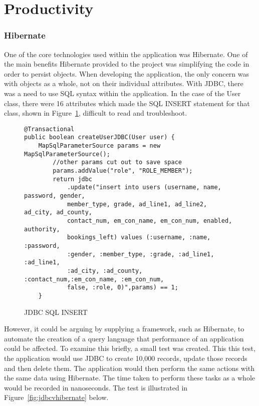 \section{Productivity}

\subsubsection{Hibernate}

One of the core technologies used within the application was Hibernate. One of the main benefits Hibernate provided to the project was simplifying the code in order to persist objects. When developing the application, the only concern was with objects as a whole, not on their individual attributes. With JDBC, there was a need to use SQL syntax within the application. In the case of the User class, there were 16 attributes which made the SQL INSERT statement for that class, shown in Figure~\ref{fig:jdbcsql}, difficult to read and troubleshoot.

\begin{figure}[H]
\begin{lstlisting}
@Transactional
public boolean createUserJDBC(User user) {
	MapSqlParameterSource params = new MapSqlParameterSource();
		//other params cut out to save space
		params.addValue("role", "ROLE_MEMBER");
		return jdbc
			.update("insert into users (username, name, password, gender, 
			member_type, grade, ad_line1, ad_line2, ad_city, ad_county,
			contact_num, em_con_name, em_con_num, enabled, authority,
			bookings_left) values (:username, :name, :password, 
			:gender, :member_type, :grade, :ad_line1, :ad_line1, 
			:ad_city, :ad_county, :contact_num,:em_con_name, :em_con_num,
			false, :role, 0)",params) == 1;
	}
\end{lstlisting}
\caption{JDBC SQL INSERT}
\label{fig:jdbcsql}
\end{figure}

However, it could be arguing by supplying a framework, such as Hibernate, to automate the creation of a query language that performance of an application could be affected. To examine this briefly, a small test was created. This this test, the application would use JDBC to create 10,000 records, update those records and then delete them. The application would then perform the same actions with the same data using Hibernate. The time taken to perform these tasks as a whole would be recorded in nanoseconds. The test is illustrated in Figure~\ref{fig:jdbcvhibernate} below.

